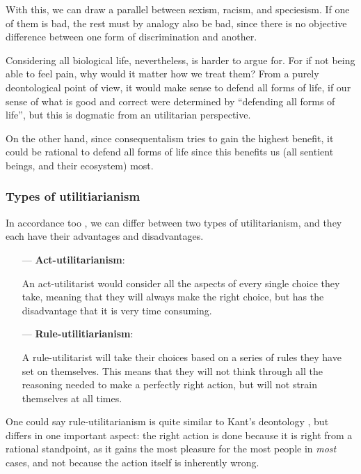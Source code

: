 \documentclass{myassignment}
\newcommand{\q}[1]{``#1''}
\begin{document}
\begin{answer}
		With this, we can draw a parallel between sexism, racism, and speciesism. If one of them is bad, the rest must by analogy also be bad, since there is no objective difference between one form of discrimination and another.

		Considering all biological life, nevertheless, is harder to argue for. For if not being able to feel pain, why would it matter how we treat them? From a purely deontological point of view, it would make sense to defend all forms of life, if our sense of what is good and correct were determined by \q{defending all forms of life}, but this is dogmatic from an utilitarian perspective. 

		On the other hand, since consequentalism tries to gain the highest benefit, it could be rational to defend all forms of life since this benefits us (all sentient beings, and their ecosystem) most.

		\subsubsection*{Types of utilitiarianism}
		In accordance too \citet{smarttypes}, we can differ between two types of utilitarianism, and they each have their advantages and disadvantages. 
		\begin{itemize}
			\item[---] \textbf{Act-utilitarianism}:

				An act-utilitarist would consider all the aspects of every single choice they take, meaning that they will always make the right choice, but has the disadvantage that it is very time consuming.

			\item[---] \textbf{Rule-utilitiarianism}:

				A rule-utilitarist will take their choices based on a series of rules they have set on themselves. This means that they will not think through all the reasoning needed to make a perfectly right action, but will not strain themselves at all times.
		\end{itemize}

		One could say rule-utilitarianism is quite similar to Kant's deontology \autocite{kant}, but differs in one important aspect: the right action is done because it is right from a rational standpoint, as it gains the most pleasure for the most people in \emph{most} cases, and not because the action itself is inherently wrong.


\end{answer}
\end{document}
